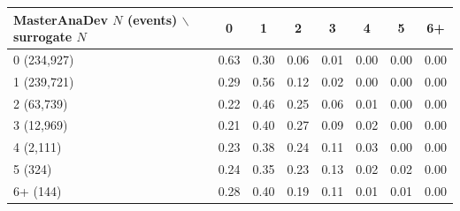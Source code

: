 \begin{tabular}{lccccccc}
\toprule
MasterAnaDev $N$ (events) $\backslash$ surrogate $N$ & 0 & 1 & 2 & 3 & 4 & 5 & 6+ \\
\midrule
0 (234,927) & 0.63 & 0.30 & 0.06 & 0.01 & 0.00 & 0.00 & 0.00 \\
1 (239,721) & 0.29 & 0.56 & 0.12 & 0.02 & 0.00 & 0.00 & 0.00 \\
2 (63,739) & 0.22 & 0.46 & 0.25 & 0.06 & 0.01 & 0.00 & 0.00 \\
3 (12,969) & 0.21 & 0.40 & 0.27 & 0.09 & 0.02 & 0.00 & 0.00 \\
4 (2,111) & 0.23 & 0.38 & 0.24 & 0.11 & 0.03 & 0.00 & 0.00 \\
5 (324) & 0.24 & 0.35 & 0.23 & 0.13 & 0.02 & 0.02 & 0.00 \\
6+ (144) & 0.28 & 0.40 & 0.19 & 0.11 & 0.01 & 0.01 & 0.00 \\
\bottomrule
\end{tabular}
